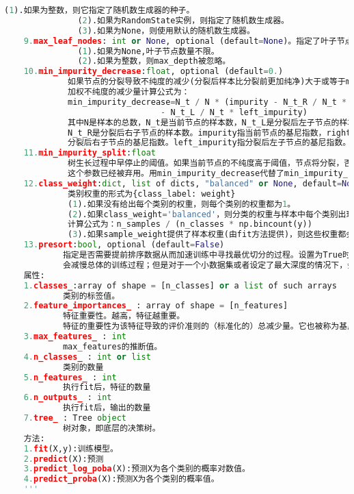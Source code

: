 \documentclass[18pt,a4paper,oneside,UTF8]{ctexart}
\begin{document}
\begin{lstlisting}[language=python]
               (1).如果为整数，则它指定了随机数生成器的种子。
               (2).如果为RandomState实例，则指定了随机数生成器。
               (3).如果为None，则使用默认的随机数生成器。
    9.max_leaf_nodes: int or None, optional (default=None)。指定了叶子节点的最大数量。
               (1).如果为None,叶子节点数量不限。
               (2).如果为整数，则max_depth被忽略。
    10.min_impurity_decrease:float, optional (default=0.)
             如果节点的分裂导致不纯度的减少(分裂后样本比分裂前更加纯净)大于或等于min_impurity_decrease，则分裂该节点。
             加权不纯度的减少量计算公式为：
             min_impurity_decrease=N_t / N * (impurity - N_t_R / N_t * right_impurity
                                - N_t_L / N_t * left_impurity)
             其中N是样本的总数，N_t是当前节点的样本数，N_t_L是分裂后左子节点的样本数，
             N_t_R是分裂后右子节点的样本数。impurity指当前节点的基尼指数，right_impurity指
             分裂后右子节点的基尼指数。left_impurity指分裂后左子节点的基尼指数。
    11.min_impurity_split:float
             树生长过程中早停止的阈值。如果当前节点的不纯度高于阈值，节点将分裂，否则它是叶子节点。
             这个参数已经被弃用。用min_impurity_decrease代替了min_impurity_split。
    12.class_weight:dict, list of dicts, "balanced" or None, default=None
             类别权重的形式为{class_label: weight}
             (1).如果没有给出每个类别的权重，则每个类别的权重都为1。
             (2).如果class_weight='balanced'，则分类的权重与样本中每个类别出现的频率成反比。
             计算公式为：n_samples / (n_classes * np.bincount(y))
             (3).如果sample_weight提供了样本权重(由fit方法提供)，则这些权重都会乘以sample_weight。
    13.presort:bool, optional (default=False)
            指定是否需要提前排序数据从而加速训练中寻找最优切分的过程。设置为True时，对于大数据集
            会减慢总体的训练过程；但是对于一个小数据集或者设定了最大深度的情况下，会加速训练过程。
    属性:
    1.classes_:array of shape = [n_classes] or a list of such arrays
            类别的标签值。
    2.feature_importances_ : array of shape = [n_features]
            特征重要性。越高，特征越重要。
            特征的重要性为该特征导致的评价准则的（标准化的）总减少量。它也被称为基尼的重要性
    3.max_features_ : int
            max_features的推断值。
    4.n_classes_ : int or list
            类别的数量
    5.n_features_ : int
            执行fit后，特征的数量
    6.n_outputs_ : int
            执行fit后，输出的数量
    7.tree_ : Tree object
            树对象，即底层的决策树。
    方法:
    1.fit(X,y):训练模型。
    2.predict(X):预测
    3.predict_log_poba(X):预测X为各个类别的概率对数值。
    4.predict_proba(X):预测X为各个类别的概率值。
    '''
\end{lstlisting}
\end{document}
